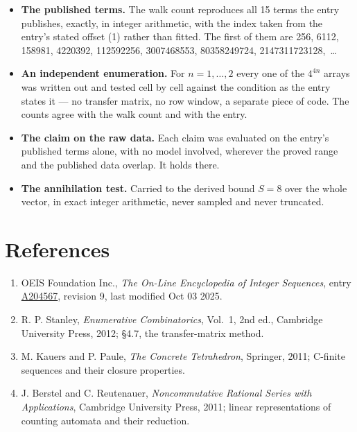 \documentclass[11pt]{article}
\theoremstyle{definition}
\begin{document}
\begin{itemize}

\item {\bfseries The published terms.} The walk count reproduces all 15 terms the entry publishes, exactly, in integer arithmetic, with the index taken from the entry's stated offset (1) rather than fitted. The first of them are 256, 6112, 158981, 4220392, 112592256, 3007468553, 80358249724, 2147311723128,~\dots

\item {\bfseries An independent enumeration.} For $n = 1,\dots,2$ every one of the $4^{4n}$ arrays was written out and tested cell by cell against the condition as the entry states it --- no transfer matrix, no row window, a separate piece of code. The counts agree with the walk count and with the entry.

\item {\bfseries The claim on the raw data.} Each claim was evaluated on the entry's published terms alone, with no model involved, wherever the proved range and the published data overlap. It holds there.

\item {\bfseries The annihilation test.} Carried to the derived bound $S = 8$ over the whole vector, in exact integer arithmetic, never sampled and never truncated.

\end{itemize}

\section{References}

\begin{enumerate}

\item OEIS Foundation Inc., \emph{The On-Line Encyclopedia of Integer Sequences}, entry \href{https://oeis.org/A204567}{A204567}, revision 9, last modified Oct 03 2025.

\item R. P. Stanley, \emph{Enumerative Combinatorics}, Vol.~1, 2nd ed., Cambridge University Press, 2012; \S4.7, the transfer-matrix method.

\item M. Kauers and P. Paule, \emph{The Concrete Tetrahedron}, Springer, 2011; C-finite sequences and their closure properties.

\item J. Berstel and C. Reutenauer, \emph{Noncommutative Rational Series with Applications}, Cambridge University Press, 2011; linear representations of counting automata and their reduction.

\end{enumerate}
\end{document}
